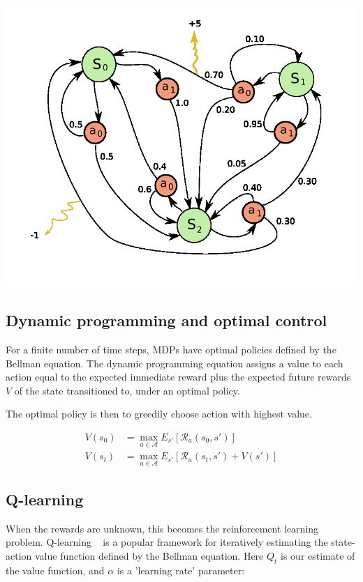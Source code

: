 \documentclass[11pt,a4,singlespacing,titlepagenumber=on]{scrreprt}
\numberwithin{equation}{chapter} %
\theoremstyle{remark}
\begin{document}
\includegraphics[scale=0.5]{MDP_example.png}

\subsection{ Dynamic programming and optimal control }

For a finite number of time steps, MDPs have optimal policies defined by the Bellman equation. The dynamic programming equation assigns a value to each action equal to the expected immediate reward plus the expected future rewards $V$ of the state transitioned to, under an optimal policy.

The optimal policy is then to greedily choose action with highest value.

\begin{align}
	V(s_0) &= \max_{a \in \mathcal{A}} E_{s'}[\mathcal{R}_a(s_0,s')] \\
	V(s_t) &= \max_{a \in \mathcal{A}} E_{s'}[\mathcal{R}_a(s_t,s') + V(s')]
\end{align}

\subsection{ Q-learning }

When the rewards are unknown, this becomes the reinforcement learning problem. Q-learning ~\cite{watkins1992q} is a popular framework for iteratively estimating the state-action value function defined by the Bellman equation. Here $Q_t$ is our estimate of the value function, and $\alpha$ is a 'learning rate' parameter:
\end{document}
